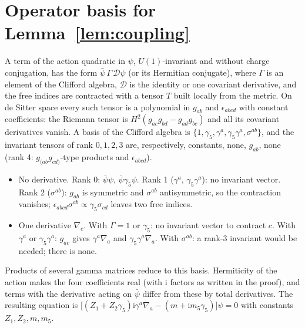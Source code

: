 \documentclass[11pt,a4paper]{article}
\theoremstyle{definition}
\newcommand{\ii}{\mathrm{i}}
\begin{document}
\appendix
\section{Operator basis for Lemma~\ref{lem:coupling}}
\label{app:basis}

A term of the action quadratic in $\psi$, $U(1)$-invariant and without charge conjugation, has the form $\bar\psi\,\Gamma\,\mathcal{D}\psi$ (or its Hermitian conjugate), where $\Gamma$ is an element of the Clifford algebra, $\mathcal{D}$ is the identity or one covariant derivative, and the free indices are contracted with a tensor $T$ built locally from the metric. On de Sitter space every such tensor is a polynomial in $g_{ab}$ and $\epsilon_{abcd}$ with constant coefficients: the Riemann tensor is $H^{2}(g_{ac}g_{bd}-g_{ad}g_{bc})$ and all its covariant derivatives vanish. A basis of the Clifford algebra is $\{1,\gamma_{5},\gamma^{a},\gamma_{5}\gamma^{a},\sigma^{ab}\}$, and the invariant tensors of rank $0,1,2,3$ are, respectively, constants, none, $g_{ab}$, none (rank 4: $g_{(ab}g_{cd)}$-type products and $\epsilon_{abcd}$).
\begin{itemize}[leftmargin=1.5em]
\item No derivative. Rank 0: $\bar\psi\psi$, $\bar\psi\gamma_{5}\psi$. Rank 1 ($\gamma^{a}$, $\gamma_{5}\gamma^{a}$): no invariant vector. Rank 2 ($\sigma^{ab}$): $g_{ab}$ is symmetric and $\sigma^{ab}$ antisymmetric, so the contraction vanishes; $\epsilon_{abcd}\sigma^{ab}\propto\gamma_{5}\sigma_{cd}$ leaves two free indices.
\item One derivative $\nabla_{c}$. With $\Gamma=1$ or $\gamma_{5}$: no invariant vector to contract $c$. With $\gamma^{a}$ or $\gamma_{5}\gamma^{a}$: $g_{ac}$ gives $\gamma^{a}\nabla_{a}$ and $\gamma_{5}\gamma^{a}\nabla_{a}$. With $\sigma^{ab}$: a rank-3 invariant would be needed; there is none.
\end{itemize}
Products of several gamma matrices reduce to this basis. Hermiticity of the action makes the four coefficients real (with $\ii$ factors as written in the proof), and terms with the derivative acting on $\bar\psi$ differ from these by total derivatives. The resulting equation is $\big[(Z_{1}+Z_{2}\gamma_{5})\ii\gamma^{a}\nabla_{a}-(m+\ii m_{5}\gamma_{5})\big]\psi=0$ with constants $Z_{1},Z_{2},m,m_{5}$.
\end{document}
